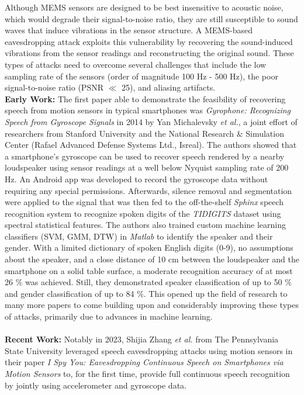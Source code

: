 \documentclass[sigconf, nonacm]{acmart}
\begin{document}
Although MEMS sensors are designed to be best insensitive to acoustic noise, which would degrade their signal-to-noise ratio, they are still susceptible to sound waves that induce vibrations in the sensor structure.
A MEMS-based eavesdropping attack exploits this vulnerability by recovering the sound-induced vibrations from the sensor readings and reconstructing the original sound.
These types of attacks need to overcome several challenges that include the low sampling rate of the sensors (order of magnitude 100 Hz - 500 Hz), the poor signal-to-noise ratio (PSNR $\ll$ 25), and aliasing artifacts.
\\[6pt]
\textbf{Early Work:} The first paper able to demonstrate the feasibility of recovering speech from motion sensors in typical smartphones was \textit{Gyrophone: Recognizing Speech from Gyroscope Signals} \cite{Gyrophone2014} in 2014 by Yan Michalevsky \textit{et al.}, a joint effort of researchers from Stanford University and the National Research \& Simulation Center (Rafael Advanced Defense Systems Ltd., Isreal).
The authors showed that a smartphone's gyroscope can be used to recover speech rendered by a nearby loudspeaker using sensor readings at a well below Nyquist sampling rate of 200 Hz.
An Android app was developed to record the gyroscope data without requiring any special permissions.
Afterwards, silence removal and segmentation were applied to the signal that was then fed to the off-the-shelf \textit{Sphinx} speech recognition system to recognize spoken digits of the \textit{TIDIGITS} dataset using spectral statistical features. The authors also trained custom machine learning classifiers (SVM, GMM, DTW) in \textit{Matlab} to identify the speaker and their gender.
With a limited dictionary of spoken English digits (0-9), no assumptions about the speaker, and a close distance of 10 cm between the loudspeaker and the smartphone on a solid table surface, a moderate recognition accuracy of at most 26 \% was achieved. Still, they demonstrated speaker classification of up to 50 \% and gender classification of up to 84 \%.
This opened up the field of research to many more papers to come building upon and considerably improving these types of attacks, primarily due to advances in machine learning.
\\~\\
\textbf{Recent Work:} Notably in 2023, Shijia Zhang \textit{et al.} from The Pennsylvania State University leveraged speech eavesdropping attacks using motion sensors in their paper \textit{I Spy You: Eavesdropping Continuous Speech on Smartphones via Motion Sensors} \cite{ISpyU2023} to, for the first time, provide full continuous speech recognition by jointly using accelerometer and gyroscope data.
\end{document}

